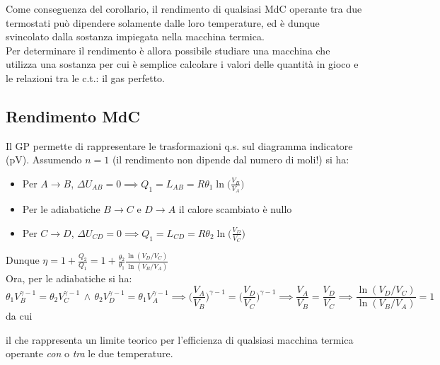 \documentclass[10pt, oneside]{book}
\newcommand{\lawbox}[2]{\begin{center}
\framebox{
\parbox{\linewidth}{
\vspace{0.3cm}
\textbf{#1} \hfill $\displaystyle #2$
\vspace{0.3cm}
}
}
\end{center}}
\newcommand{\ds}{\displaystyle}
\begin{document}
Come conseguenza del corollario, il rendimento di qualsiasi MdC operante tra due termostati può dipendere solamente dalle loro temperature, ed è dunque svincolato dalla sostanza impiegata nella macchina termica.\\
Per determinare il rendimento è allora possibile studiare una macchina che utilizza una sostanza per cui è semplice calcolare i valori delle quantità in gioco e le relazioni tra le c.t.: il gas perfetto.

\subsection{Rendimento MdC}
Il GP permette di rappresentare le trasformazioni q.s. sul diagramma indicatore (pV). Assumendo $n=1$ (il rendimento non dipende dal numero di moli!) si ha:
\begin{itemize}
\item Per $A \rightarrow B$, $\ds \Delta U_{AB} = 0 \implies Q_1 = L_{AB} = R \theta_1 \ln \bigg( \frac{V_B}{V_A} \bigg)$
\item Per le adiabatiche $B \rightarrow C$ e $D \rightarrow A$ il calore scambiato è nullo
\item Per $C \rightarrow D$, $\ds \Delta U_{CD} = 0 \implies Q_1 = L_{CD} = R \theta_2 \ln \bigg( \frac{V_D}{V_C} \bigg)$
\end{itemize}
Dunque $\ds \eta = 1 + \frac{Q_2}{Q_1} = 1 + \frac{\theta_2}{\theta_1} \frac{\ln(V_D \big/ V_C)}{\ln (V_B \big/ V_A)}$\\
Ora, per le adiabatiche si ha:
\[\theta_1 V_B^{\gamma - 1} = \theta_2 V_C^{\gamma - 1} \, \land \, \theta_2 V_D^{\gamma - 1} = \theta_1 V_A^{\gamma -1} \implies \bigg(\frac{V_A}{V_B}\bigg)^{\gamma - 1} = \bigg(\frac{V_D}{V_C}\bigg)^{\gamma - 1} \implies \frac{V_A}{V_B} = \frac{V_D}{V_C} \implies  \frac{\ln(V_D \big/ V_C)}{\ln (V_B \big/ V_A)} = 1\]
da cui
\lawbox{Rendimento MdC}{\eta_C = 1 - \frac{\theta_2}{\theta_1}}
il che rappresenta un limite teorico per l'efficienza di qualsiasi macchina termica operante \textit{con} o \textit{tra} le due temperature.
\end{document}
